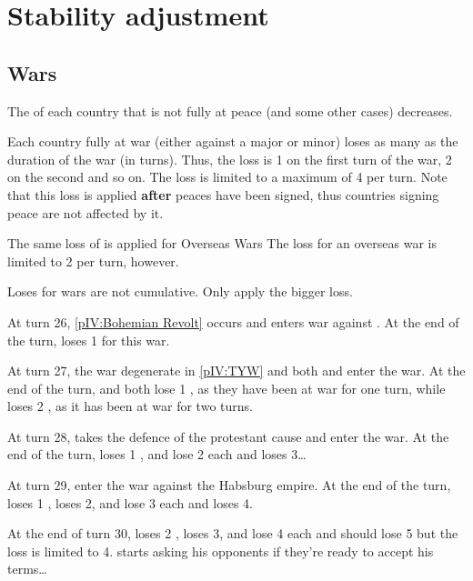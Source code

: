 



\section{Stability adjustment}\label{chPeace:Stability}
\subsection{Wars}
\aparag The \STAB of each country that is not fully at peace (and some other
cases) decreases.

\bparag Each country fully at war (either against a major or minor) loses as
many \STAB as the duration of the war (in turns).
\bparag Thus, the loss is 1 \STAB on the first turn of the war, 2 on the
second and so on.
\bparag The loss is limited to a maximum of 4 \STAB per turn.
\bparag Note that this loss is applied \textbf{after} peaces have been signed,
thus countries signing peace are not affected by it.

\bparag The same loss of \STAB is applied for Overseas Wars
\bparag The loss for an overseas war is limited to 2 \STAB per turn, however.

 Loses for wars are not cumulative. Only apply the
bigger loss.

\begin{exemple}
  At turn 26, \ref{pIV:Bohemian Revolt} occurs and \AUS enters war against
  \paysBoheme. At the end of the turn, \AUS loses 1 \STAB for this war.

  At turn 27, the war degenerate in \ref{pIV:TYW} and both \HIS and \HOL enter
  the war. At the end of the turn, \HIS and \HOL both lose 1 \STAB, as they
  have been at war for one turn, while \AUS loses 2 \STAB, as it has been at
  war for two turns.

  At turn 28, \SUE takes the defence of the protestant cause and enter the
  war. At the end of the turn, \SUE loses 1 \STAB, \HIS and \HOL lose 2 each
  and \AUS loses 3\ldots

  At turn 29, \FRA enter the war against the Habsburg empire. At the end of
  the turn, \FRA loses 1 \STAB, \SUE loses 2, \HIS and \HOL lose 3 each and
  \AUS loses 4.

  At the end of turn 30, \FRA loses 2 \STAB, \SUE loses 3, \HOL and \HIS lose
  4 each and \AUS should lose 5 but the loss is limited to
  4. \ministreRichelieu starts asking his opponents if they're ready to accept
  his terms\ldots
\end{exemple}


